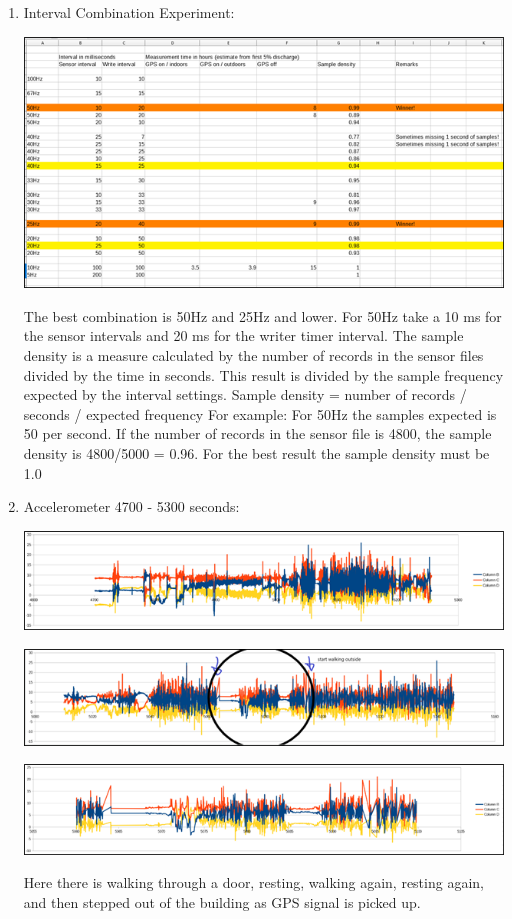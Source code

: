 \documentclass[12pt, a4paper]{article}
\begin{document}
\begin{enumerate}
\begin{center}
\end{center}
    \item Interval Combination Experiment:
        \begin{center}
    \includegraphics[width=.7\textwidth]{Pic 32.png}
\end{center}
The best combination is 50Hz and 25Hz and lower. For 50Hz take a 10 ms for the sensor intervals and 20 ms for the writer timer interval.
The sample density is a measure calculated by the number of records in the sensor files divided by the time in seconds. This result is divided by the sample frequency expected by the interval settings.
Sample density = number of records / seconds / expected frequency
For example:
For 50Hz the samples expected is 50 per second. 
If the number of records in the sensor file is 4800, the sample density is 4800/5000 = 0.96.
For the best result the sample density must be 1.0

\item Accelerometer 4700 - 5300 seconds:
    \begin{center}
    \includegraphics[width=.75\textwidth]{Pic 33.png}
\end{center}
    \begin{center}
    \includegraphics[width=.75\textwidth]{Pic 34.png}
\end{center}
    \begin{center}
    \includegraphics[width=.75\textwidth]{Pic 35.png}
\end{center}
Here there is walking through a door, resting, walking again, resting again, and then stepped out of the building as GPS signal is picked up.
\end{enumerate}
\cleardoublepage
\end{document}
